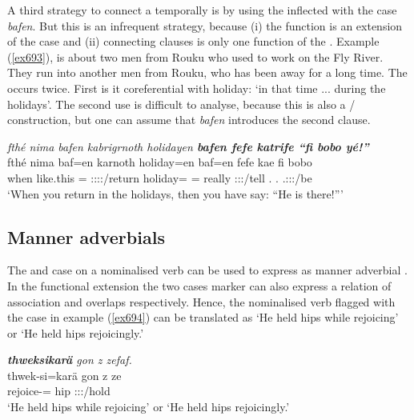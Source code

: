 A third strategy to connect a  temporally is by using the  inflected with the  case \emph{bafen}. But this is an infrequent strategy, because (i) the  function is an extension of the  case and (ii) connecting clauses is only one function of the . Example (\ref{ex693}), is about two men from Rouku who used to work on the Fly River. They run into another men from Rouku, who has been away for a long time. The  occurs twice. First is it coreferential with holiday: `in that time ... during the holidays'. The second use is difficult to analyse, because this is also a / construction, but one can assume that \emph{bafen} introduces the second clause.

\begin{exe}
	\ex \emph{fthé nima bafen kabrigrnoth holidayen \textbf{bafen fefe katrife ``fi bobo yé!''}}\\
	\gll fthé nima baf=en karnoth holiday=en baf=en fefe kae fi bobo \\
	when {like.this} \Recog=\Loc{} \Sdu:\Sbj:\Imp:\Ipfv:\Andat/return holiday=\Loc{} \Recog=\Loc{} really \Sdu:\Sbj:\Imp:\Pfv/tell \Third.\Abs{} \Med.\All{} \Tsg.\Masc:\Sbj:\Nonpast:\Ipfv/be\\
	\trans `When you return in the holidays, then you have say: ``He is there!'''\\
	\label{ex693}
\end{exe}

\subsection{Manner adverbials}\label{manneradv}

The  and  case on a nominalised verb can be used to express as manner adverbial . In the functional extension the two cases marker can also express a relation of association and  overlaps respectively. Hence, the nominalised verb flagged with the  case in example (\ref{ex694}) can be translated as `He held hips while rejoicing' or `He held hips rejoicingly.'

\begin{exe}
	\ex \emph{\textbf{thweksikarä} gon z zefaf.}\\
	\gll thwek-si=karä gon z ze\\
	rejoice-\Nmlz=\Prop{} hip \Iam{} \Stsg:\Sbj:\Rpst:\Pfv/hold\\
	\trans `He held hips while rejoicing' or `He held hips rejoicingly.'\\
	\label{ex694}
\end{exe}

